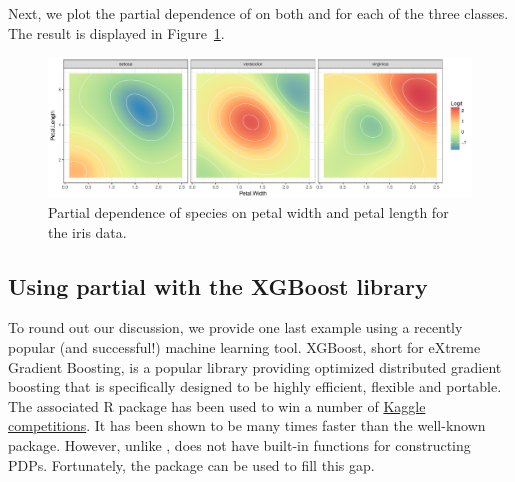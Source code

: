 Next, we plot the partial dependence of  on both  and  for each of the three classes. The result is displayed in Figure~\ref{fig:partial_iris}. %

\begin{figure}[!htbp]
  \centering
  \includegraphics[width=1.0\linewidth]{partial_iris_svm}
  \caption{Partial dependence of species on petal width and petal length for the iris data.}
  \label{fig:partial_iris}
\end{figure}


\subsection{Using partial with the XGBoost library}
\label{sec:xgboost}

To round out our discussion, we provide one last example using a recently popular (and successful!) machine learning tool. XGBoost, short for eXtreme Gradient Boosting, is a popular library providing optimized distributed gradient boosting that is specifically designed to be highly efficient, flexible and portable. The associated R package  has been used to win a number of \href{https://www.kaggle.com/}{Kaggle competitions}. It has been shown to be many times faster than the well-known  package. However, unlike ,  does not have built-in functions for constructing PDPs. Fortunately, the  package can be used to fill this gap.

